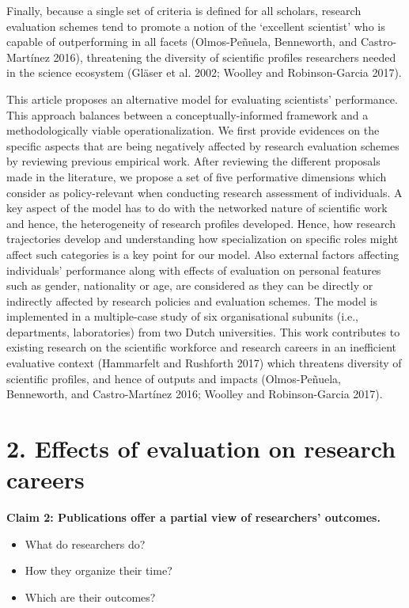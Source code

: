 \documentclass[]{elsarticle} %
\providecommand{\tightlist}{%
  \setlength{\itemsep}{0pt}\setlength{\parskip}{0pt}}
\begin{document}
Finally, because a single set of criteria is defined for all scholars,
research evaluation schemes tend to promote a notion of the `excellent
scientist' who is capable of outperforming in all facets (Olmos-Peñuela,
Benneworth, and Castro-Martínez 2016), threatening the diversity of
scientific profiles researchers needed in the science ecosystem (Gläser
et al. 2002; Woolley and Robinson-Garcia 2017).

This article proposes an alternative model for evaluating scientists'
performance. This approach balances between a conceptually-informed
framework and a methodologically viable operationalization. We first
provide evidences on the specific aspects that are being negatively
affected by research evaluation schemes by reviewing previous empirical
work. After reviewing the different proposals made in the literature, we
propose a set of five performative dimensions which consider as
policy-relevant when conducting research assessment of individuals. A
key aspect of the model has to do with the networked nature of
scientific work and hence, the heterogeneity of research profiles
developed. Hence, how research trajectories develop and understanding
how specialization on specific roles might affect such categories is a
key point for our model. Also external factors affecting individuals'
performance along with effects of evaluation on personal features such
as gender, nationality or age, are considered as they can be directly or
indirectly affected by research policies and evaluation schemes. The
model is implemented in a multiple-case study of six organisational
subunits (i.e., departments, laboratories) from two Dutch universities.
This work contributes to existing research on the scientific workforce
and research careers in an inefficient evaluative context (Hammarfelt
and Rushforth 2017) which threatens diversity of scientific profiles,
and hence of outputs and impacts (Olmos-Peñuela, Benneworth, and
Castro-Martínez 2016; Woolley and Robinson-Garcia 2017).

\hypertarget{effects-of-evaluation-on-research-careers}{%
\section{2. Effects of evaluation on research
careers}\label{effects-of-evaluation-on-research-careers}}

\textbf{Claim 2: Publications offer a partial view of researchers'
outcomes.}

\begin{itemize}
\tightlist
\item
  What do researchers do?
\item
  How they organize their time?
\item
  Which are their outcomes?
\end{itemize}
\end{document}
